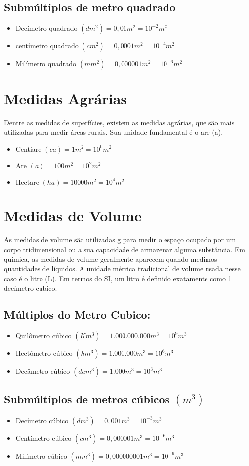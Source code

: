 \documentclass[11pt,fleqn]{book} %
\begin{document}
\subsection{Submúltiplos de metro quadrado}
\begin{itemize}
	\item Decímetro quadrado $(dm^2) = 0,01m^2 = 10^{-2}m^2$
	\item centímetro quadrado $(cm^2) = 0,0001m^2 = 10^{-4}m^2$
	\item Milímetro quadrado $(mm^2)= 0,000001m^2 = 10^{-6}m^2$
\end{itemize}
\section{Medidas Agrárias}
Dentre as medidas de superfícies, existem as medidas
agrárias, que são mais utilizadas para medir áreas rurais. Sua
unidade fundamental é o are (a).

\begin{itemize}
	\item Centiare $(ca) = 1m^2=10^0m^2$
	\item Are $(a)= 100m^2 = 10^2m^2$
	\item Hectare $(ha) = 10000m^2 = 10^4m^2$
\end{itemize}
\section{Medidas de Volume} 
As medidas de volume são utilizadas g
para medir o espaço ocupado por um
corpo tridimensional ou a sua
capacidade de armazenar alguma
substância. Em química, as medidas de
volume geralmente aparecem quando
medimos quantidades de líquidos. A
unidade métrica tradicional de volume
usada nesse caso é o litro (L). Em termos
do SI, um litro é definido exatamente
como 1 decímetro cúbico. 
\subsection{Múltiplos do Metro Cubico:}
\begin{itemize}
    \item Quilômetro cúbico $(Km^3) = 1.000.000.000 m^3 = 10^9 m^3$
    \item Hectômetro cúbico $(hm^3) = 1.000.000 m^3 = 10^6 m^3$
    \item Decâmetro cúbico $(dam^3) = 1.000 m^3 = 10^3 m^3$
\end{itemize}
\subsection{Submúltiplos de metros cúbicos $(m^3)$}
\begin{itemize}
    \item Decímetro cúbico $(dm^3) = 0,001 m^3 = 10^{-3} m^3$
    \item Centímetro cúbico $(cm^3) = 0,000001 m^3 = 10^{-6} m^3$
    \item Milímetro cúbico $(mm^3) = 0,000000001 m^3 = 10^{-9} m^3$
\end{itemize}
\end{document}
